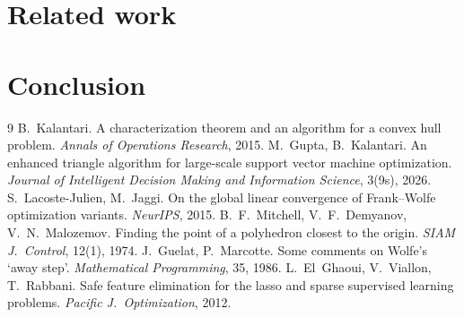 \documentclass[11pt]{article}
\theoremstyle{remark}
\begin{document}
\section{Related work}

\section{Conclusion}

\begin{thebibliography}{9}
 B.~Kalantari. A characterization theorem and an
algorithm for a convex hull problem. \emph{Annals of Operations
Research}, 2015.
 M.~Gupta, B.~Kalantari. An enhanced triangle algorithm
for large-scale support vector machine optimization. \emph{Journal of Intelligent Decision Making and Information Science},
3(9s), 2026.
 S.~Lacoste-Julien, M.~Jaggi. On the global linear
convergence of Frank--Wolfe optimization variants. \emph{NeurIPS}, 2015.
 B.~F.~Mitchell, V.~F.~Demyanov, V.~N.~Malozemov. Finding
the point of a polyhedron closest to the origin. \emph{SIAM J.\ Control},
12(1), 1974.
 J.~Guelat, P.~Marcotte. Some comments on Wolfe's `away
step'. \emph{Mathematical Programming}, 35, 1986.
 L.~El~Ghaoui, V.~Viallon, T.~Rabbani. Safe feature
elimination for the lasso and sparse supervised learning problems.
\emph{Pacific J.\ Optimization}, 2012.
\end{thebibliography}
\end{document}

